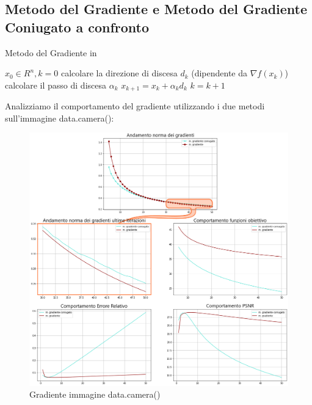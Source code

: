 {\color{oorange}\subsection{Metodo del Gradiente e Metodo del Gradiente Coniugato a confronto}}

\begin{algorithm}[H]
	\caption{Metodo del Gradiente in }\label{alg:mg}
	\begin{algorithmic}[1]
		\State $x_0 \in R^n, k=0$
            \State calcolare la direzione di discesa $d_k$ (dipendente da $\nabla f(x_k)$)
            \State calcolare il passo di discesa $\alpha_k$
            \State $x_{k+1} = x_k+\alpha_kd_k$
            \State $k = k+1$
        \EndWhile
	\end{algorithmic}
\end{algorithm}

Analizziamo il comportamento del gradiente utilizzando i due metodi sull'immagine data.camera():
\begin{figure}[H]
    \centering
    \includegraphics[width=\textwidth]{output/MGCvsMG-enph.png}
    \caption{Gradiente immagine data.camera()}
    \label{fig:MGCvsMGdatacamera}
\end{figure}


